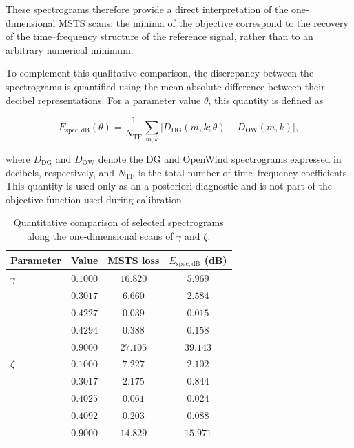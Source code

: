 \documentclass[11pt,a4paper]{report}
\theoremstyle{plain}
\theoremstyle{definition}
\begin{document}
These spectrograms therefore provide a direct interpretation of the
one-dimensional MSTS scans: the minima of the objective correspond to the
recovery of the time--frequency structure of the reference signal, rather than
to an arbitrary numerical minimum.

To complement this qualitative comparison, the discrepancy between the
spectrograms is quantified using the mean absolute difference between their
decibel representations. For a parameter value $\theta$, this quantity is
defined as

\begin{equation}
E_{\mathrm{spec,dB}}(\theta)
=
\frac{1}{N_{\mathrm{TF}}}
\sum_{m,k}
\left|
D_{\mathrm{DG}}(m,k;\theta)
-
D_{\mathrm{OW}}(m,k)
\right|,
\label{eq:spectral_mae_scan}
\end{equation}

where $D_{\mathrm{DG}}$ and $D_{\mathrm{OW}}$ denote the DG and OpenWind
spectrograms expressed in decibels, respectively, and $N_{\mathrm{TF}}$ is
the total number of time--frequency coefficients. This quantity is used only
as an a posteriori diagnostic and is not part of the objective function used
during calibration.

\begin{table}[!ht]
    \centering
    \caption{
    Quantitative comparison of selected spectrograms along the
    one-dimensional scans of $\gamma$ and $\zeta$.
    }
    \label{tab:spectral_scan_comparison}
    \begin{tabular}{lccc}
        \toprule
        Parameter & Value & MSTS loss & $E_{\mathrm{spec,dB}}$ (dB) \\
        \midrule
        $\gamma$ & $0.1000$ & $16.820$ & $5.969$ \\
                 & $0.3017$ & $6.660$  & $2.584$ \\
                 & $\mathbf{0.4227}$ & $\mathbf{0.039}$ & $\mathbf{0.015}$ \\
                 & $0.4294$ & $0.388$  & $0.158$ \\
                 & $0.9000$ & $27.105$ & $39.143$ \\
        \midrule
        $\zeta$  & $0.1000$ & $7.227$  & $2.102$ \\
                 & $0.3017$ & $2.175$  & $0.844$ \\
                 & $\mathbf{0.4025}$ & $\mathbf{0.061}$ & $\mathbf{0.024}$ \\
                 & $0.4092$ & $0.203$  & $0.088$ \\
                 & $0.9000$ & $14.829$ & $15.971$ \\
        \bottomrule
    \end{tabular}
\end{table}
\end{document}
